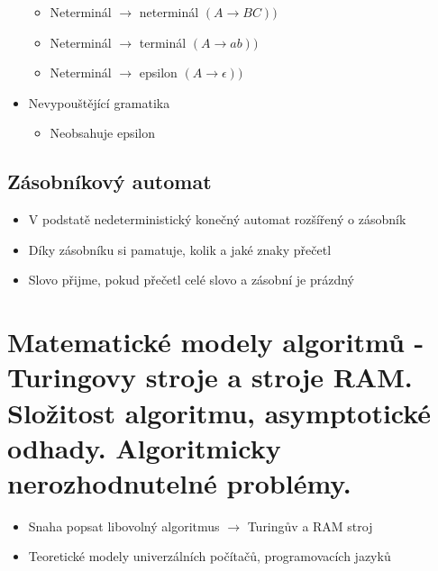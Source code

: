 \documentclass[openany]{book}
\begin{document}
\begin{itemize}
    \begin{itemize}
        \item Neterminál \(\rightarrow\) neterminál \(\left( A \rightarrow BC \right))\)
        \item Neterminál \(\rightarrow\) terminál \(\left( A \rightarrow ab \right))\)
        \item Neterminál \(\rightarrow\) epsilon \(\left( A \rightarrow \epsilon \right))\)
    \end{itemize}
    \item Nevypouštějící gramatika
    \begin{itemize}
        \item Neobsahuje epsilon
    \end{itemize}
\end{itemize}

\subsection{Zásobníkový automat}
\begin{itemize}
    \item V podstatě nedeterministický konečný automat rozšířený o zásobník
    \item Díky zásobníku si pamatuje, kolik a jaké znaky přečetl
    \item Slovo přijme, pokud přečetl celé slovo a zásobní je prázdný
\end{itemize}

\section{Matematické modely algoritmů -Turingovy stroje a stroje RAM. Složitost algoritmu, asymptotické odhady. Algoritmicky nerozhodnutelné problémy.}

\begin{itemize}
    \item Snaha popsat libovolný algoritmus \(\rightarrow\) Turingův a RAM stroj
    \item Teoretické modely univerzálních počítačů, programovacích jazyků
\end{itemize}
\end{document}
